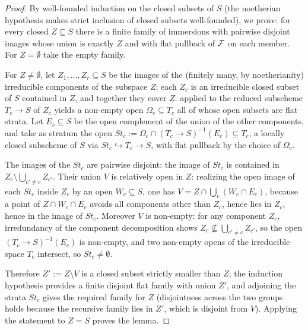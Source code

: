 \begin{proof}
  \leanok
  By well-founded induction on the closed subsets of \(S\) (the noetherian
  hypothesis makes strict inclusion of closed subsets well-founded), we prove:
  for every closed \(Z \subseteq S\) there is a finite family of immersions
  with pairwise disjoint images whose union is exactly \(Z\) and with flat
  pullback of \(\mathcal{F}\) on each member.  For \(Z = \emptyset\) take the empty
  family.

  For \(Z \neq \emptyset\), let \(Z_1, \dots, Z_r \subseteq S\) be the images
  of the (finitely many, by noetherianity) irreducible components of the
  subspace \(Z\); each \(Z_c\) is an irreducible closed subset of \(S\)
  contained in \(Z\), and together they cover \(Z\).
   applied to the reduced subscheme
  \(T_c \to S\) of \(Z_c\) yields a non-empty open \(\Omega_c \subseteq T_c\)
  all of whose open subsets are flat strata.  Let
  \(E_c \subseteq S\) be the open complement of the union of the other
  components, and take as stratum the open
  \(\mathit{St}_c := \Omega_c \cap (T_c \to S)^{-1}(E_c) \subseteq T_c\),
  a locally closed subscheme of \(S\) via
  \(\mathit{St}_c \hookrightarrow T_c \to S\), with flat pullback by the
  choice of \(\Omega_c\).

  The images of the \(\mathit{St}_c\) are pairwise disjoint: the image of
  \(\mathit{St}_c\) is contained in \(Z_c \setminus \bigcup_{c' \neq c} Z_{c'}\).
  Their union \(V\) is relatively open in \(Z\): realizing the open image of
  each \(\mathit{St}_c\) inside \(Z_c\) by an open \(W_c \subseteq S\), one has
  \(V = Z \cap \bigcup_c (W_c \cap E_c)\), because a point of
  \(Z \cap W_c \cap E_c\) avoids all components other than \(Z_c\), hence lies
  in \(Z_c\), hence in the image of \(\mathit{St}_c\).  Moreover \(V\) is
  non-empty: for any component \(Z_{c}\), irredundancy of the component
  decomposition shows \(Z_c \not\subseteq \bigcup_{c' \neq c} Z_{c'}\), so the
  open \((T_c \to S)^{-1}(E_c)\) is non-empty, and two non-empty opens of the
  irreducible space \(T_c\) intersect, so \(\mathit{St}_c \neq \emptyset\).

  Therefore \(Z' := Z \setminus V\) is a closed subset strictly smaller than
  \(Z\); the induction hypothesis provides a finite disjoint flat family with
  union \(Z'\), and adjoining the strata \(\mathit{St}_c\) gives the required
  family for \(Z\) (disjointness across the two groups holds because the
  recursive family lies in \(Z'\), which is disjoint from \(V\)).  Applying
  the statement to \(Z = S\) proves the lemma.
\end{proof}

